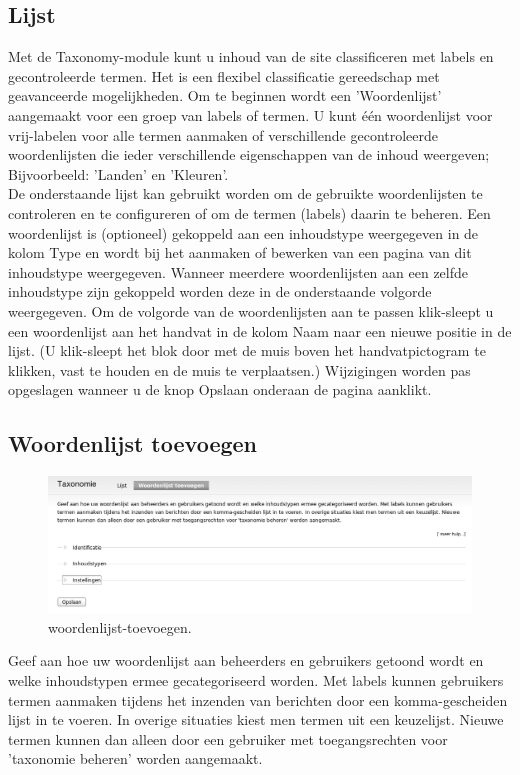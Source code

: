 \subsection{Lijst}
Met de Taxonomy-module kunt u inhoud van de site classificeren met labels en
gecontroleerde termen. Het is een flexibel classificatie gereedschap met geavanceerde mogelijkheden.
Om te beginnen wordt een 'Woordenlijst' aangemaakt voor een groep van labels of termen.
U kunt één woordenlijst voor vrij-labelen voor alle termen aanmaken of verschillende gecontroleerde
woordenlijsten die ieder verschillende eigenschappen van de inhoud weergeven; Bijvoorbeeld: 'Landen' en 'Kleuren'.
\\
De onderstaande lijst kan gebruikt worden om de gebruikte woordenlijsten te controleren
en te configureren of om de termen (labels) daarin te beheren. Een woordenlijst is (optioneel)
gekoppeld aan een inhoudstype weergegeven in de kolom Type en wordt bij het aanmaken of bewerken
van een pagina van dit inhoudstype weergegeven. Wanneer meerdere woordenlijsten aan een zelfde
inhoudstype zijn gekoppeld worden deze in de onderstaande volgorde weergegeven. Om de volgorde
van de woordenlijsten aan te passen klik-sleept u een woordenlijst aan het handvat in de kolom
Naam naar een nieuwe positie in de lijst. (U klik-sleept het blok door met de muis boven het
handvatpictogram te klikken, vast te houden en de muis te verplaatsen.) Wijzigingen worden
pas opgeslagen wanneer u de knop Opslaan onderaan de pagina aanklikt.
\subsection{Woordenlijst toevoegen} 
\begin{figure}[!h]
    \centering
   \includegraphics[scale=0.3,angle=0]{woordenlijst-toevoegen}
   \caption{woordenlijst-toevoegen.\label{white}}
 \end{figure}
Geef aan hoe uw woordenlijst aan beheerders en gebruikers getoond wordt en welke
inhoudstypen ermee gecategoriseerd worden. Met labels kunnen gebruikers termen aanmaken
tijdens het inzenden van berichten door een komma-gescheiden lijst in te voeren.
In overige situaties kiest men termen uit een keuzelijst. Nieuwe termen kunnen dan
alleen door een gebruiker met toegangsrechten voor 'taxonomie beheren' worden aangemaakt.
